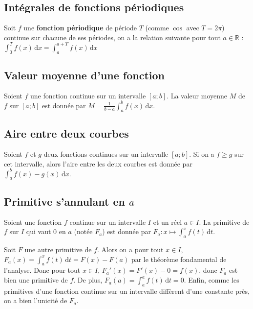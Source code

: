 	\subsection{Intégrales de fonctions périodiques}

	\begin{formula}
		Soit $f$ une \textbf{fonction périodique} de période $T$ (comme $\cos$ avec $T = 2\pi$) continue sur chacune de ses périodes, on a la relation suivante pour tout $a \in \mathbb{R}$ :
		\newpar
		$\displaystyle{\int_{0}^{T} f(x) \, \mathrm{d}x = \int_{a}^{a + T} f(x) \, \mathrm{d}x}$
	\end{formula}

	\subsection{Valeur moyenne d'une fonction}

	\begin{formula}
		Soient $f$ une fonction continue sur un intervalle $[a;b]$. La valeur moyenne $M$ de $f$ sur $[a;b]$ est donnée par $\displaystyle{M = \frac{1}{b-a}\int_{a}^{b} f(x) \, \mathrm{d}x}$.
	\end{formula}

	\subsection{Aire entre deux courbes}

	\begin{formula}
		Soient $f$ et $g$ deux fonctions continues sur un intervalle $[a;b]$. Si on a $f \geq g$ sur cet intervalle, alors l'aire entre les deux courbes est donnée par $\displaystyle{\int_{a}^{b} f(x) - g(x) \, \mathrm{d}x}$.
	\end{formula}

	\subsection{Primitive s'annulant en \texorpdfstring{$a$}{a}}

	\begin{formula}
		Soient une fonction $f$ continue sur un intervalle $I$ et un réel $a \in I$. La primitive de $f$ sur $I$ qui vaut $0$ en $a$ (notée $F_a$) est donnée par $\displaystyle{F_a : x \mapsto \int_{a}^{x} f(t) \, \mathrm{d}t}$.
	\end{formula}

	\begin{demonstration}
		Soit $F$ une autre primitive de $f$. Alors on a pour tout $x \in I$, $\displaystyle{F_a(x) = \int_a^x f(t) \, \mathrm{d}t} = F(x) - F(a)$ par le théorème fondamental de l'analyse.
		\newpar
		Donc pour tout $x \in I$, $F_a'(x) = F'(x) - 0 = f(x)$, donc $F_a$ est bien une primitive de $f$.
		\newpar
		De plus, $\displaystyle{F_a(a) = \int_{a}^{a} f(t) \, \mathrm{d}t = 0}$.
		\newpar
		Enfin, comme les primitives d'une fonction continue sur un intervalle diffèrent d'une constante près, on a bien l'unicité de $F_a$.
	\end{demonstration}

